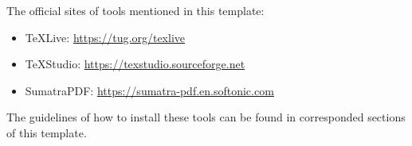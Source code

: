 \documentclass[winfonts,master,twoside]{njuthesis}
\begin{document}
\begin{englishabstract}
	The official sites of tools mentioned in this template:
	
	\begin{itemize}
		\item TeXLive: \url{https://tug.org/texlive}
		\item TeXStudio: \url{https://texstudio.sourceforge.net}
		\item SumatraPDF: \url{https://sumatra-pdf.en.softonic.com}
	\end{itemize} 
	
	The guidelines of how to install these tools can be found in corresponded sections of this template.
\end{englishabstract}

%
%
%
%

\tableofcontents

\listoffigures

\listoftables

\mainmatter



\end{document}
